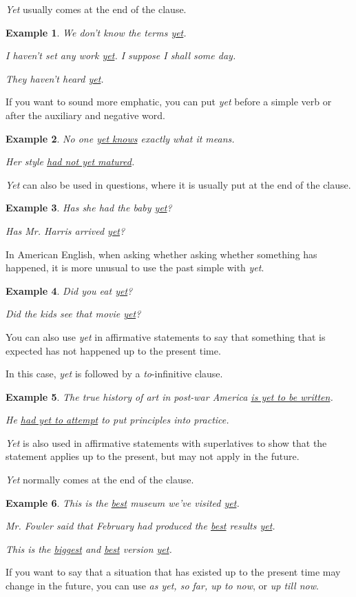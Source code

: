 \documentclass[oneside]{book}
\numberwithin{equation}{section}
\newtheorem{example}{Example}[section]
\begin{document}
\textit{Yet} usually comes at the end of the clause.
\begin{example}
    We don't know the terms \underline{yet}.
    
    I haven't set any work \underline{yet}. I suppose I shall some day.
    
    They haven't heard \underline{yet}.
\end{example}
If you want to sound more emphatic, you can put \textit{yet} before a simple verb or after the auxiliary and negative word.
\begin{example}
    No one \underline{yet knows} exactly what it means.
    
    Her style \underline{had not yet matured}.
\end{example}\textit{Yet} can also be used in questions, where it is usually put at the end of the clause.
\begin{example}
    Has she had the baby \underline{yet}?
    
    Has Mr. Harris arrived \underline{yet}?
\end{example}
In American English, when asking whether asking whether something has happened, it is more unusual to use the past simple with \textit{yet}.
\begin{example}
    Did you eat \underline{yet}?
    
    Did the kids see that movie \underline{yet}?
\end{example}
%
\noindent{} You can also use \textit{yet} in affirmative statements to say that something that is expected has not happened up to the present time.

In this case, \textit{yet} is followed by a \textit{to}-infinitive clause.
\begin{example}
    The true history of art in post-war America \underline{is yet to be written}.
    
    He \underline{had yet to attempt} to put principles into practice.
\end{example}
%
\noindent{} \textit{Yet} is also used in affirmative statements with superlatives to show that the statement applies up to the present, but may not apply in the future.

\textit{Yet} normally comes at the end of the clause.
\begin{example}
    This is the \underline{best} museum we've visited \underline{yet}.
    
    Mr. Fowler said that February had produced the \underline{best} results \underline{yet}.
    
    This is the \underline{biggest} and \underline{best} version \underline{yet}.
\end{example}
%
\noindent{} If you want to say that a situation that has existed up to the present time may change in the future, you can use \textit{as yet, so far, up to now}, or \textit{up till now}.
\end{document}
